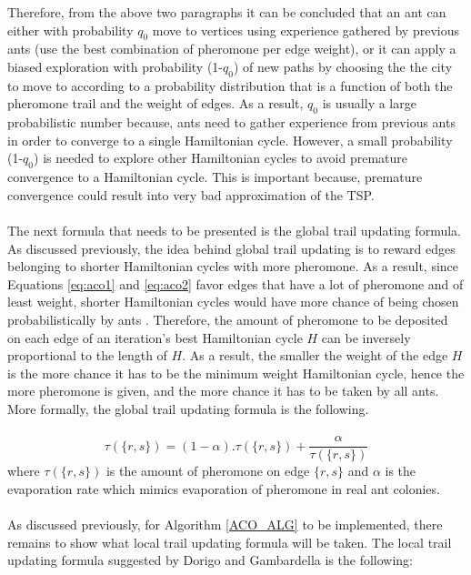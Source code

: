 \documentclass{article}
\begin{document}
Therefore, from the above two paragraphs it can be concluded that an ant can either with probability $q_0$ move to vertices using experience gathered by previous ants (use the best combination of pheromone per edge weight), or it can apply a biased exploration with probability (1-$q_0$) of new paths by choosing the the city to move to according to a probability distribution that is a function of both the pheromone trail and the weight of edges. As a result, $q_0$ is usually a large probabilistic number because, ants need to gather experience from previous ants in order to converge to a single Hamiltonian cycle. However, a small probability (1-$q_0$) is needed to explore other Hamiltonian cycles to avoid premature convergence to a Hamiltonian cycle. This is important because, premature convergence could result into very bad approximation of the TSP. \cite{dorigo_gambardella_1997}\\\\
The next formula that needs to be presented is the global trail updating formula. As discussed previously, the idea behind global trail updating is to reward edges belonging to shorter Hamiltonian cycles with more pheromone. As a result, since Equations \ref{eq:aco1} and \ref{eq:aco2} favor edges that have a lot of pheromone and of least weight, shorter Hamiltonian cycles would have more chance of being chosen probabilistically by ants . Therefore, the amount of pheromone to be deposited on each edge of an iteration's best Hamiltonian cycle $H$ can be inversely proportional to the length of $H$. As a result, the smaller the weight of the edge $H$ is the more chance it has to be the minimum weight Hamiltonian cycle, hence the more pheromone is given, and the more chance it has to be taken by all ants. More formally, the global trail updating formula is the following.\cite{dorigo_gambardella_1997}\\\\
\begin{equation}
  \label{eq:aco3}
  \tau(\{r,s\})=(1-\alpha).\tau(\{r,s\})+\frac{\alpha}{\tau(\{r,s\})}
\end{equation}
where $\tau(\{r,s\})$ is the amount of pheromone on edge $\{r,s\}$ and $\alpha$ is the evaporation rate which mimics evaporation of pheromone in real ant colonies. \cite{dorigo_gambardella_1997}\\\\
As discussed previously, for Algorithm \ref{ACO_ALG} to be implemented, there remains to show what local trail updating formula will be taken. The local trail updating formula suggested by Dorigo and Gambardella  \cite{dorigo_gambardella_1997} is the following:
\end{document}
